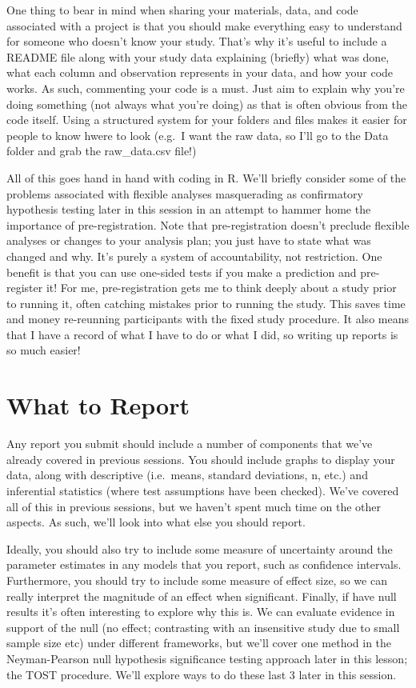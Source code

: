 \documentclass[
]{book}
\begin{document}
One thing to bear in mind when sharing your materials, data, and code associated with a project is that you should make everything easy to understand for someone who doesn't know your study. That's why it's useful to include a README file along with your study data explaining (briefly) what was done, what each column and observation represents in your data, and how your code works. As such, commenting your code is a must. Just aim to explain why you're doing something (not always what you're doing) as that is often obvious from the code itself. Using a structured system for your folders and files makes it easier for people to know hwere to look (e.g.~I want the raw data, so I'll go to the Data folder and grab the raw\_data.csv file!)

All of this goes hand in hand with coding in R. We'll briefly consider some of the problems associated with flexible analyses masquerading as confirmatory hypothesis testing later in this session in an attempt to hammer home the importance of pre-registration. Note that pre-registration doesn't preclude flexible analyses or changes to your analysis plan; you just have to state what was changed and why. It's purely a system of accountability, not restriction. One benefit is that you can use one-sided tests if you make a prediction and pre-register it! For me, pre-registration gets me to think deeply about a study prior to running it, often catching mistakes prior to running the study. This saves time and money re-reunning participants with the fixed study procedure. It also means that I have a record of what I have to do or what I did, so writing up reports is so much easier!

\hypertarget{what-to-report}{%
\section{What to Report}\label{what-to-report}}

Any report you submit should include a number of components that we've already covered in previous sessions. You should include graphs to display your data, along with descriptive (i.e.~means, standard deviations, n, etc.) and inferential statistics (where test assumptions have been checked). We've covered all of this in previous sessions, but we haven't spent much time on the other aspects. As such, we'll look into what else you should report.

Ideally, you should also try to include some measure of uncertainty around the parameter estimates in any models that you report, such as confidence intervals. Furthermore, you should try to include some measure of effect size, so we can really interpret the magnitude of an effect when significant. Finally, if have null results it's often interesting to explore why this is. We can evaluate evidence in support of the null (no effect; contrasting with an insensitive study due to small sample size etc) under different frameworks, but we'll cover one method in the Neyman-Pearson null hypothesis significance testing approach later in this lesson; the TOST procedure. We'll explore ways to do these last 3 later in this session.
\end{document}
